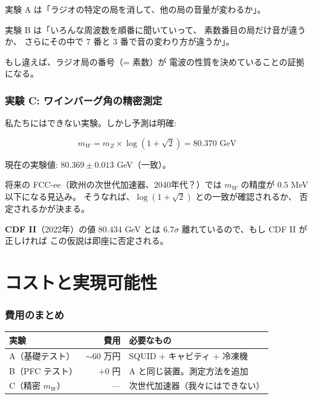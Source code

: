 \documentclass[12pt,a4paper]{article}
\begin{document}
\begin{storybox}
実験 A は「ラジオの特定の局を消して、他の局の音量が変わるか」。

実験 B は「いろんな周波数を順番に聞いていって、
素数番目の局だけ音が違うか、
さらにその中で $7$ 番と $3$ 番で音の変わり方が違うか」。

もし違えば、ラジオ局の番号（= 素数）が
電波の性質を決めていることの証拠になる。
\end{storybox}

\section{実験 C: ワインバーグ角の精密測定}

\begin{expbox}[実験 C: $m_W$ の将来測定]
私たちにはできない実験。しかし予測は明確:

$$m_W = m_Z \times \log(1+\sqrt{2}) = 80.370 \text{ GeV}$$

現在の実験値: $80.369 \pm 0.013$ GeV（一致）。

将来の FCC-ee（欧州の次世代加速器、2040年代？）では
$m_W$ の精度が $0.5$ MeV 以下になる見込み。
そうなれば、$\log(1+\sqrt{2})$ との一致が確認されるか、
否定されるかが決まる。

\textbf{CDF II}（2022年）の値 $80.434$ GeV とは
6.7$\sigma$ 離れているので、もし CDF II が正しければ
この仮説は即座に否定される。
\end{expbox}

\part{コストと実現可能性}

\section{費用のまとめ}

\begin{center}
\renewcommand{\arraystretch}{1.4}
\begin{tabular}{lrl}
\toprule
実験 & 費用 & 必要なもの \\
\midrule
A（基礎テスト） & $\sim 60$ 万円 & SQUID + キャビティ + 冷凍機 \\
B（PFC テスト） & $+0$ 円 & A と同じ装置。測定方法を追加 \\
C（精密 $m_W$） & --- & 次世代加速器（我々にはできない） \\
\bottomrule
\end{tabular}
\end{center}
\end{document}
